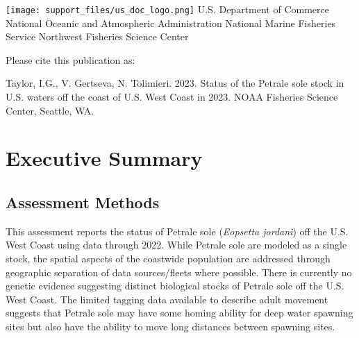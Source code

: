 \documentclass[
]{scrartcl}
\renewcommand*\contentsname{Table of contents}
\newcommand\contentsname{Table of contents}
\begin{document}
\begin{titlepage}
\begin{minipage}[b][\textheight][s]{.975\textwidth}
  \vfill


  \vspace{1\baselineskip}

  \texttt{[image: support\_files/us\_doc\_logo.png]}\newline
  U.S. Department of Commerce\newline
  National Oceanic and Atmospheric Administration\newline
  National Marine Fisheries Service\newline
  Northwest Fisheries Science Center %

  \end{minipage}%
  \restoregeometry
  \end{titlepage}

\renewcommand*\contentsname{Table of contents}
{
\hypersetup{linkcolor=}
\setcounter{tocdepth}{3}
\tableofcontents
}
\listoffigures
\listoftables
\newpage{}

Please cite this publication as:

Taylor, I.G., V. Gertseva, N. Tolimieri. 2023. Status of the Petrale
sole stock in U.S. waters off the coast of U.S. West Coast in 2023. NOAA
Fisheries Science Center, Seattle, WA.

\newpage{}

\section{Executive Summary}\label{executive-summary}

\subsection{Assessment Methods}\label{assessment-methods}

This assessment reports the status of Petrale sole (\textit{Eopsetta jordani})
off the U.S. West Coast using data through 2022. While Petrale sole are
modeled as a single stock, the spatial aspects of the coastwide
population are addressed through geographic separation of data
sources/fleets where possible. There is currently no genetic evidence
suggesting distinct biological stocks of Petrale sole off the U.S. West
Coast. The limited tagging data available to describe adult movement
suggests that Petrale sole may have some homing ability for deep water
spawning sites but also have the ability to move long distances between
spawning sites.
\end{document}
